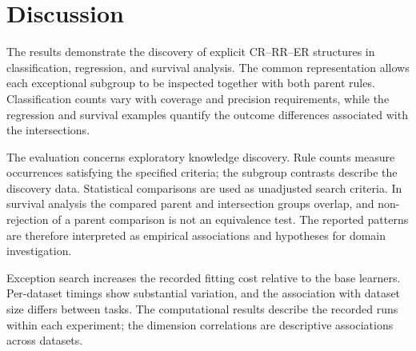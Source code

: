 \section{Discussion}
\label{outstanding-evidence}
The results demonstrate the discovery of explicit CR--RR--ER structures in
classification, regression, and survival analysis. The common representation
allows each exceptional subgroup to be inspected together with both parent
rules. Classification counts vary with coverage and precision requirements,
while the regression and survival examples quantify the outcome differences
associated with the intersections.

The evaluation concerns exploratory knowledge discovery. Rule counts measure
occurrences satisfying the specified criteria; the subgroup contrasts describe
the discovery data. Statistical comparisons are used as unadjusted search
criteria. In survival analysis the compared parent and intersection groups
overlap, and non-rejection of a parent comparison is not an equivalence test.
The reported patterns are therefore interpreted as empirical associations
and hypotheses for domain investigation.

Exception search increases the recorded fitting cost relative to the base
learners. Per-dataset timings show substantial variation, and the association
with dataset size differs between tasks. The computational results describe
the recorded runs within each experiment; the dimension correlations are
descriptive associations across datasets.
